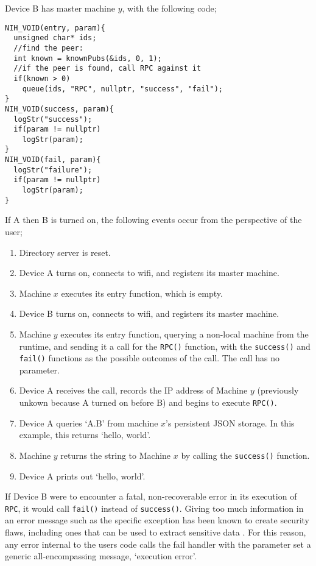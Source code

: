 \documentclass{article}
\begin{document}
Device B has master machine \( y \), with the following code;
\begin{tcolorbox}[colback=white,grow to left by=2.5mm,grow to right by=2.5mm,left*=0mm,right*=0mm,sharp corners]
\begin{verbatim}
NIH_VOID(entry, param){
  unsigned char* ids;
  //find the peer:
  int known = knownPubs(&ids, 0, 1);
  //if the peer is found, call RPC against it
  if(known > 0)
    queue(ids, "RPC", nullptr, "success", "fail");
}
NIH_VOID(success, param){
  logStr("success");
  if(param != nullptr)
    logStr(param);
}
NIH_VOID(fail, param){
  logStr("failure");
  if(param != nullptr)
    logStr(param);
}
\end{verbatim}
\end{tcolorbox}

If A then B is turned on, the following events occur from the perspective of the user;

\begin{enumerate}
\item Directory server is reset.
\item Device A turns on, connects to wifi, and registers its master machine.
\item Machine \( x \) executes its entry function, which is empty.
\item Device B turns on, connects to wifi, and registers its master machine.
\item Machine \( y \) executes its entry function, querying a non-local machine from the runtime, and sending it a call for the \texttt{RPC()} function, with the \texttt{success()} and \texttt{fail()} functions as the possible outcomes of the call. The call has no parameter.
\item Device A receives the call, records the IP address of Machine \( y \) (previously unkown because A turned on before B) and begins to execute \texttt{RPC()}.
\item Device A queries \lq A.B' from machine \( x \)'s persistent JSON storage. In this example, this returns \lq hello, world'.
\item Machine \( y \) returns the string to Machine \( x \) by calling the \texttt{success()} function.
\item Device A prints out \lq hello, world'.
\end{enumerate}

If Device B were to encounter a fatal, non-recoverable error in its execution of \texttt{RPC}, it would call \texttt{fail()} instead of \texttt{success()}. Giving too much information in an error message such as the specific exception has been known to create security flaws, including ones that can be used to extract sensitive data \cite{weberror}. For this reason, any error internal to the users code calls the fail handler with the parameter set a generic all-encompassing message, \lq execution error'.
\end{document}
